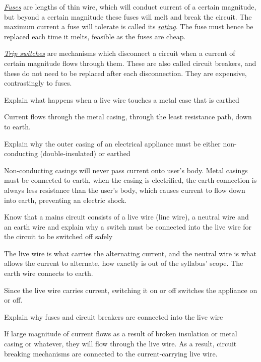 \ul{\emph{Fuses}} are lengths of thin wire, which will conduct 
current of a certain magnitude, but beyond a certain magnitude these fuses will melt and break
the circuit. The maximum current a fuse will tolerate is called its \ul{\emph{rating}}. The
fuse must hence be replaced each time it melts, feasible as the fuses are cheap.

\ul{\emph{Trip switches}} are mechanisms which disconnect a circuit when a current of certain
magnitude flows through them. These are also called circuit breakers, and these do not need
to be replaced after each disconnection. They are expensive, contrastingly to fuses.

\begin{subpoint}
Explain what happens when a live wire touches a metal case that is earthed
\end{subpoint}

Current flows through the metal casing, through the least resistance path, down to earth.

\begin{subpoint}
Explain why the outer casing of an electrical appliance must be either non-conducting (double-insulated) or 
earthed
\end{subpoint}

Non-conducting casings will never pass current onto user's body. Metal casings must be connected
to earth, when the casing is electrified, the earth connection is always less resistance than
the user's body, which causes current to flow down into earth, preventing an electric shock.

\begin{subpoint}
Know that a mains circuit consists of a live wire (line wire), a neutral wire and an earth wire and explain 
why a switch must be connected into the live wire for the circuit to be switched off safely
\end{subpoint}

The live wire is what carries the alternating current, and the neutral wire is what allows the
current to alternate, how exactly is out of the syllabus' scope. The earth wire connects to earth.

Since the live wire carries current, switching it on or off switches the appliance on or off.

\begin{subpoint}
Explain why fuses and circuit breakers are connected into the live wire
\end{subpoint}

If large magnitude of current flows as a result of broken insulation or metal casing or whatever,
they will flow through the live wire. As a result, circuit breaking mechanisms are connected
to the current-carrying live wire.
